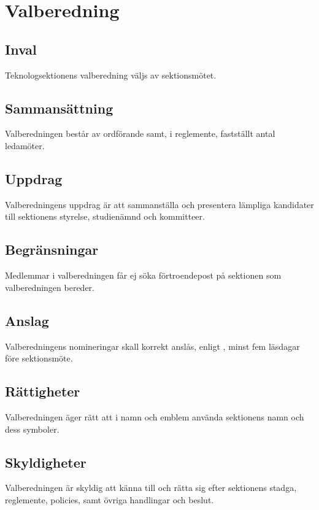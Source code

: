 \section{Valberedning}

\subsection{Inval}
Teknologsektionens valberedning väljs av sektionsmötet.

\subsection{Sammansättning}
Valberedningen består av ordförande samt, i reglemente, fastställt antal ledamöter.

\subsection{Uppdrag}
Valberedningens uppdrag är att sammanställa och presentera lämpliga kandidater
till sektionens styrelse, studienämnd och kommitteer.

\subsection{Begränsningar}
Medlemmar i valberedningen får ej söka förtroendepost på sektionen som valberedningen bereder.

\subsection{Anslag}
Valberedningens nomineringar skall korrekt anslås, enligt , minst fem läsdagar före sektionsmöte.

\subsection{Rättigheter}
Valberedningen äger rätt att i namn och emblem använda sektionens namn och dess symboler.

\subsection{Skyldigheter}
Valberedningen är skyldig att känna till och rätta sig efter sektionens stadga, reglemente, policies, samt övriga handlingar och beslut.